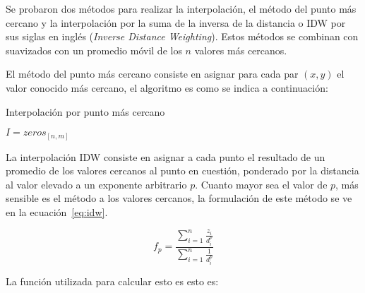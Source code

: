 Se probaron dos métodos para realizar la interpolación, el método del punto
más cercano y la interpolación por la suma de la inversa de la distancia o 
IDW por sus siglas en inglés (\emph{Inverse Distance Weighting}).
%
Estos métodos se combinan con suavizados con un promedio móvil de los $n$
valores más cercanos.

El método del punto más cercano consiste en asignar para cada par $(x, y)$
el valor conocido más cercano, el algoritmo es como se indica a continuación:

\begin{algorithm}
 \caption{Interpolación por punto más cercano}\label{algo:mas_cercano}
    \SetAlgoLined



    \BlankLine
     $I=zeros_{[n,m]}$\;
\end{algorithm}

La interpolación IDW consiste en asignar a cada punto el resultado de un promedio
de los valores cercanos al punto en cuestión, ponderado por la distancia al valor
elevado a un exponente arbitrario $p$.
%
Cuanto mayor sea el valor de $p$, más sensible es el método a los valores cercanos,
la formulación de este método se ve en la ecuación~\ref{eq:idw}.

\begin{equation}
    f_p = \frac{\sum_{i=1}^{n} \frac{z_i}{d_i^p}} {\sum_{i=1}^{n} \frac{1}{d_i^p}}
    \label{eq:idw}
\end{equation}

La función utilizada para calcular esto es esto es:

